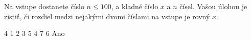 




Na vstupe dostanete číslo $n \leq 100$, a kladné číslo $x$ a $n$ čísel. Vašou úlohou je zistiť, či rozdiel medzi nejakými dvomi číslami na vstupe je rovný $x$.

 4
1 2 3 5 4 7 6
\vystup
Ano\koniec


